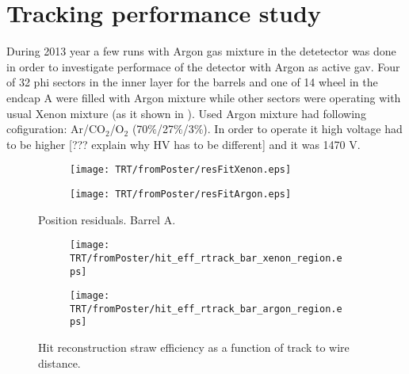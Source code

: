 \section{Tracking performance study}
\label{sec:TRT:trackPerf}

During 2013 year a few runs with Argon gas mixture in the detetector was done in order to investigate performace of the detector with Argon as active gav.
Four of 32 phi sectors in the inner layer for the barrels and one of 14 wheel in the endcap A were filled with Argon mixture while other sectors were operating 
with usual Xenon mixture (as it shown in ). Used Argon mixture had following cofiguration: Ar/CO$_{2}$/O$_{2}$ (70$\%$/27$\%$/3$\%$). In order to operate it high voltage had
to be higher [??? explain why HV has to be different] and it was 1470 V.




\begin{figure}[hb]

\begin{subfigure}{.5\textwidth}
  \centering
  \texttt{[image: TRT/fromPoster/resFitXenon.eps]}
\end{subfigure}%
\begin{subfigure}{.5\textwidth}
  \centering
  \texttt{[image: TRT/fromPoster/resFitArgon.eps]}
\end{subfigure}

\caption{Position residuals. Barrel A.}
  \label{fig:resFit}
\end{figure}





\begin{figure}[hb]

\begin{subfigure}{.5\textwidth}
  \centering
  \texttt{[image: TRT/fromPoster/hit\_eff\_rtrack\_bar\_xenon\_region.eps]}
\end{subfigure}%
\begin{subfigure}{.5\textwidth}
  \centering
  \texttt{[image: TRT/fromPoster/hit\_eff\_rtrack\_bar\_argon\_region.eps]}
\end{subfigure}

\caption{Hit reconstruction straw efficiency as a function of track to wire distance.}
  \label{fig:hit_eff_rtrack_bar}
\end{figure}



